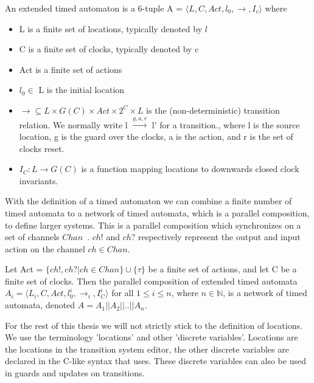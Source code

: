 \begin{mydef}
\label{def:TA}
An extended timed automaton is a 6-tuple A = $\langle L, C, Act, l_0, \rightarrow, I_c\rangle$ where
{\renewcommand\labelitemi{--}
	\begin{itemize}
		\item L is a finite set of locations, typically denoted by $l$
		\item C is a finite set of clocks, typically denoted by c
		\item Act is a finite set of actions
		\item $l_0 \in$ L is the initial location
		\item $\rightarrow \subseteq L \times G(C) \times Act \times 2^C \times L$ is the (non-deterministic) transition relation. We normally write l $\stackrel{g,a,r}{\longrightarrow}$ l' for a transition., where l is the source location, g is the guard over the clocks, a is the action, and r is the set of clocks reset.
		\item $I_C : L \rightarrow G(C)$ is a function mapping locations to downwards closed clock invariants.
	\end{itemize}
}
\end{mydef}

With the definition of a timed automaton we can combine a finite number of timed automata to a network of timed automata, which is a parallel composition, to define larger systems. This is a parallel composition which synchronizes on a set of channels $Chan$~\cite{UPPAAL}. $ch!$ and $ch?$ respectively represent the output and input action on the channel $ch \in Chan$.

\begin{mydef}
\label{def:networkTA}
Let Act = $\{ch!,ch?|ch \in Chan\} \cup \{\tau\}$ be a finite set of actions, and let C be a finite set of clocks. Then the parallel composition of extended timed automata $A_i = \langle L_i, C, Act, l^i_0, \rightarrow_{i}, I^i_C\rangle$ for all $1 \leq i \leq n$, where $n \in \mathbb{N}$, is a network of timed automata, denoted $A = A_1||A_2||..||A_n$.
\end{mydef}

For the rest of this thesis we will not strictly stick to the definition of locations. We use the terminology 'locations' and other 'discrete variables'. Locations are the locations in the \uppaal{} transition system editor, the other discrete variables are declared in the C-like syntax that \uppaal{} uses. These discrete variables can also be used in guards and updates on transitions.


